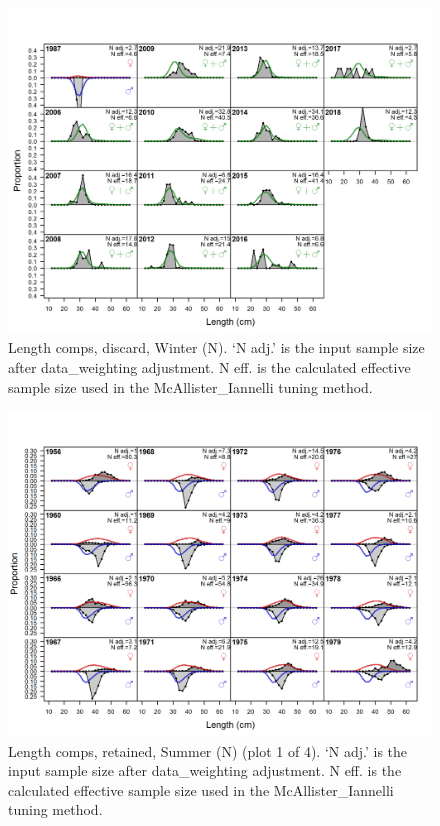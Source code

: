 \documentclass[12pt,]{article}
\begin{document}
\begin{figure}
\centering
\includegraphics{r4ss/plots_mod1/comp_lenfit_flt1mkt1.png}
\caption{Length comps, discard, Winter (N). `N adj.' is the input sample
size after data\_weighting adjustment. N eff. is the calculated
effective sample size used in the McAllister\_Iannelli tuning method.
\label{fig:length_fits}}
\end{figure}

\begin{figure}
\centering
\includegraphics{r4ss/plots_mod1/comp_lenfit_flt2mkt2_page1.png}
\caption{Length comps, retained, Summer (N) (plot 1 of 4). `N adj.' is
the input sample size after data\_weighting adjustment. N eff. is the
calculated effective sample size used in the McAllister\_Iannelli tuning
method. \label{fig:length_fits}}
\end{figure}
\end{document}
